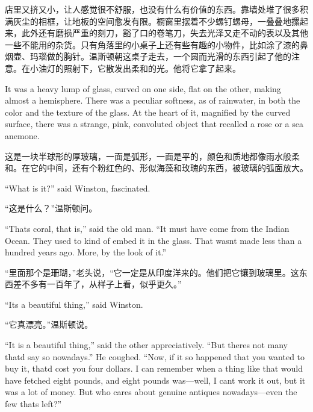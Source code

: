 \begin{paracol}{2}
\switchcolumn

店里又挤又小，让人感觉很不舒服，也没有什么有价值的东西。靠墙处堆了很多积满灰尘的相框，让地板的空间愈发有限。橱窗里摆着不少螺钉螺母，一叠叠地摞起来，此外还有磨损严重的刻刀，豁了口的卷笔刀，失去光泽又走不动的表以及其他一些不能用的杂货。只有角落里的小桌子上还有些有趣的小物件，比如涂了漆的鼻烟壶、玛瑙做的胸针。温斯顿朝这桌子走去，一个圆而光滑的东西引起了他的注意。在小油灯的照射下，它散发出柔和的光。他将它拿了起来。

\switchcolumn*

It was a heavy lump of glass, curved on one side, flat on the other,
making almost a hemisphere. There was a peculiar softness, as of
rainwater, in both the color and the texture of the glass. At the heart
of it, magnified by the curved surface, there was a strange, pink,
convoluted object that recalled a rose or a sea anemone.

\switchcolumn

这是一块半球形的厚玻璃，一面是弧形，一面是平的，颜色和质地都像雨水般柔和。在它的中间，还有个粉红色的、形似海藻和玫瑰的东西，被玻璃的弧面放大。

\switchcolumn*

``What is it?'' said Winston, fascinated.

\switchcolumn

``这是什么？''温斯顿问。

\switchcolumn*

``That\textquotesingle s coral, that is,'' said the old man. ``It must have
come from the Indian Ocean. They used to kind of embed it in the glass.
That wasn\textquotesingle t made less than a hundred years ago. More, by
the look of it.''

\switchcolumn

``里面那个是珊瑚，''老头说，``它一定是从印度洋来的。他们把它镶到玻璃里。这东西差不多有一百年了，从样子上看，似乎更久。''

\switchcolumn*

``It\textquotesingle s a beautiful thing,'' said Winston.

\switchcolumn

``它真漂亮。''温斯顿说。

\switchcolumn*

``It is a beautiful thing,'' said the other appreciatively. ``But
there\textquotesingle s not many that\textquotesingle d say so
nowadays.'' He coughed. ``Now, if it so happened that you wanted to buy
it, that\textquotesingle d cost you four dollars. I can remember when a
thing like that would have fetched eight pounds, and eight pounds
was---well, I can\textquotesingle t work it out, but it was a lot of
money. But who cares about genuine antiques nowadays---even the few
that\textquotesingle s left?''


\end{paracol}
